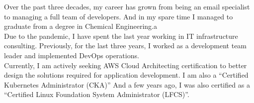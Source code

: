 \documentclass[letter,10pt]{article}
\begin{document}


\hspace*{10mm}Over the past three decades, my career has grown from being an email specialist to managing a full team of developers.
And in my spare time I managed to graduate from a degree in Chemical Engineering.a\\
\vspace*{3mm}
\hspace*{10mm}Due to the pandemic, I have spent the last year working in IT infrastructure consulting. Previously, for the last three years, I worked as a development team leader and implemented DevOps operations.\\
\vspace*{3mm}
\hspace*{10mm}Currently, I am actively seeking AWS Cloud Architecting certification to better design the solutions required for application development. I am also a ``Certified Kubernetes Administrator (CKA)'' And a few years ago, I was also certified as a ``Certified Linux Foundation System Administrator (LFCS)''.
\end{document}
